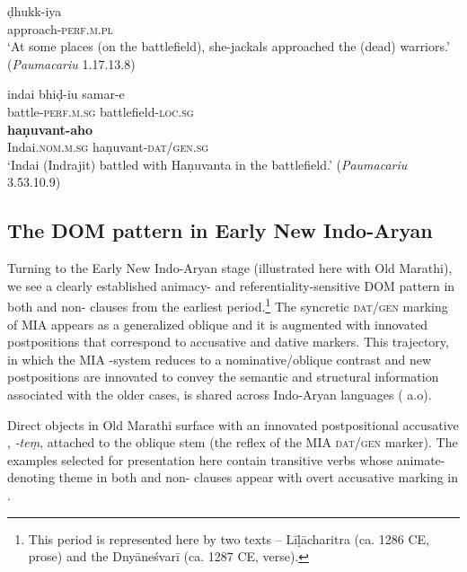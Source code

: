 \documentclass[output=paper,
modfonts
]{LSP/langsci}
\begin{document}
\begin{exe}
\begin{xlist}
\gll ḍhukk-iya \\
approach-\textsc{perf.m.pl} \\
\glt `At some places (on the battlefield), she-jackals approached the (dead) warriors.' (\textit{Paumacariu} 1.17.13.8)

\ex\gll indai bhiḍ-iu samar-e \\
battle-\textsc{perf.m.sg} battlefield-\textsc{loc.sg} \\

\gll \textbf{haṇuvant-aho}\\ Indai.\textsc{nom.m.sg} 
haṇuvant-\textsc{dat/gen.sg} \\
\glt `Indai (Indrajit)  battled with Haṇuvanta in the battlefield.'  (\textit{Paumacariu} 3.53.10.9)
\end{xlist}
\end{exe}



    \subsection{The DOM pattern in Early New Indo-Aryan} 
Turning to the Early New Indo-Aryan stage (illustrated here with Old Marathi), we see a clearly established  animacy- and referentiality-sensitive DOM pattern in both  and non- clauses from the earliest period.\footnote{This  period is represented here  by two texts --  Līḷācharitra (ca. 1286 CE, prose) and  the Dnyāneśvarī (ca. 1287 CE, verse).
} The syncretic \textsc{dat/gen} marking of MIA appears as a generalized oblique  and it is augmented with innovated postpositions that correspond to accusative and dative  markers. This trajectory, in which the MIA -system reduces to a nominative/oblique contrast and new postpositions are innovated to convey the semantic and structural information  associated with the older cases,  is shared across Indo-Aryan languages (\citealt{masica91,bubenik96,bubenik98} a.o). 

Direct objects in Old Marathi surface with an innovated postpositional accusative ,  \textit{-teṃ}, attached to the oblique stem (the reflex of the MIA \textsc{dat/gen} marker).   The examples selected for presentation here contain transitive verbs whose animate-denoting theme  in both  and non- clauses appear with   overt accusative marking in . 
\end{document}
